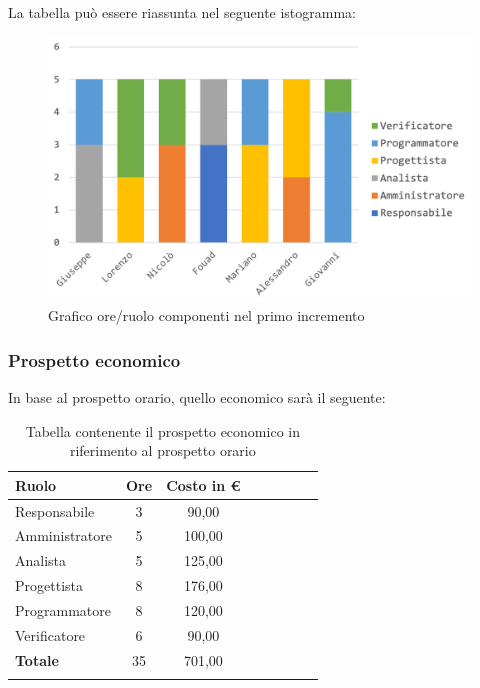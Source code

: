 		La tabella può essere riassunta nel seguente istogramma:
		\begin{figure}[H]
			\centering
			\includegraphics[width=0.8\linewidth]{./images/preventivo/incremento1-1.png}
			\caption{Grafico ore/ruolo componenti nel primo incremento}
			\label{fig:grafico suddivione ruoli incremento I}
		\end{figure}
	
		\subsubsection{Prospetto economico}
		In base al prospetto orario, quello economico sarà il seguente: 
		
		\begin{longtable}{|l|c|c|c|c|c|c|c|}
			\hline
			\rowcolor{lighter-grayer}
			\textbf{Ruolo} & \textbf{Ore} & \textbf{Costo in € } \\
			\hline
			\endfirsthead
			
			\hline
			Responsabile 	    & 3 & 90,00\\
			\hline 
			\hline
			Amministratore	   & 5 & 100,00\\
			\hline
			\hline
			Analista 				& 5 & 125,00\\
			\hline
			\hline
			Progettista 		   & 8 & 176,00\\
			\hline
			\hline
			Programmatore 	  & 8 & 120,00\\
			\hline
			\hline
			Verificatore 		   & 6 & 90,00\\
			\hline
			\textbf{Totale} 	 & 35 & 701,00\\
			\hline
			\caption{Tabella contenente il prospetto economico in riferimento al prospetto orario}
		\end{longtable}
		\pagebreak
		
